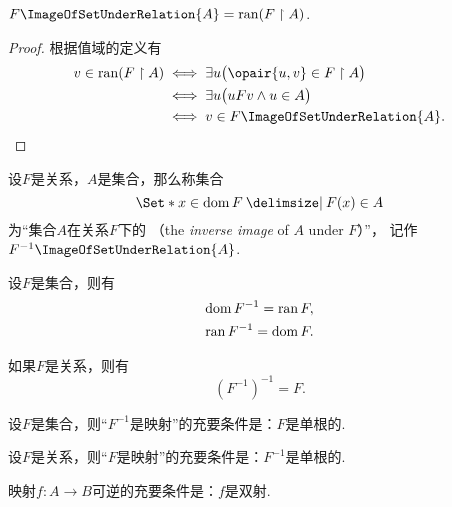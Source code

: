 \begin{theorem}
\(F\ImageOfSetUnderRelation{A} = \ran(F \upharpoonright A)\).
\begin{proof}
根据值域的定义有\begin{align*}
	v \in \ran(F \upharpoonright A)
	&\iff
	\exists u \bigl( \opair{u,v} \in F \upharpoonright A \bigr) \\
	&\iff
	\exists u \bigl( u F v \land u \in A \bigr) \\
	&\iff
	v \in F\ImageOfSetUnderRelation{A}.
	\qedhere
\end{align*}
\end{proof}
\end{theorem}

\begin{definition}
设\(F\)是关系，\(A\)是集合，那么称集合\[
	\Set*{ x \in \dom F \given F(x) \in A }
\]为“集合\(A\)在关系\(F\)下的%
（the \emph{inverse image} of \(A\) under \(F\)）”，
记作\(F^{-1}\ImageOfSetUnderRelation{A}\).
\end{definition}

\begin{theorem}
设\(F\)是集合，则有\begin{gather}
	\operatorname{dom} F^{-1} = \operatorname{ran} F, \\
	\operatorname{ran} F^{-1} = \operatorname{dom} F.
\end{gather}

如果\(F\)是关系，则有\begin{equation}
	(F^{-1})^{-1} = F.
\end{equation}
\end{theorem}

\begin{theorem}
设\(F\)是集合，则“\(F^{-1}\)是映射”的充要条件是：\(F\)是单根的.

设\(F\)是关系，则“\(F\)是映射”的充要条件是：\(F^{-1}\)是单根的.
\end{theorem}

\begin{theorem}\label{theorem:集合论.映射可逆的充要条件}
映射\(f\colon A \to B\)可逆的充要条件是：\(f\)是双射.
\end{theorem}


